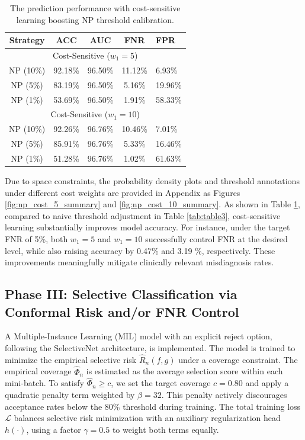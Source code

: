 \documentclass[sigconf,review,anonymous]{acmart}
\theoremstyle{remark}
\begin{document}
\begin{table}[htbp]
    \centering
    \caption{The prediction performance with cost-sensitive learning boosting NP threshold calibration.}
    \label{tab:csl_np_results}
    \begin{tabular}{ccccl}
        \toprule
        Strategy & ACC & AUC & FNR & FPR \\
        \midrule
        \multicolumn{5}{c}{Cost-Sensitive ($w_1=5$)} \\
        \midrule
         NP (10\%) & 92.18\% & 96.50\% & 11.12\% & 6.93\% \\
         NP (5\%)  & 83.19\% & 96.50\% & 5.16\%  & 19.96\% \\
         NP (1\%)  & 53.69\% & 96.50\% & 1.91\%  & 58.33\% \\
        \midrule
        \multicolumn{5}{c}{Cost-Sensitive ($w_1=10$)} \\
        \midrule
         NP (10\%) & 92.26\% & 96.76\% & 10.46\% & 7.01\% \\
         NP (5\%)  & 85.91\% & 96.76\% & 5.33\%  & 16.46\% \\
         NP (1\%)  & 51.28\% & 96.76\% & 1.02\%  & 61.63\% \\
        \bottomrule
    \end{tabular}
    \vskip -0.1in
\end{table}

Due to space constraints, the probability density plots and threshold annotations under different cost weights are provided in Appendix as Figures \ref{fig:np_cost_5_summary} and \ref{fig:np_cost_10_summary}. As shown in Table \ref{tab:csl_np_results}, compared to naive threshold adjustment in Table \ref{tab:table3}, cost‑sensitive learning substantially improves model accuracy. For instance, under the target FNR of 5\%, both $w_{1}=5$ and $w_{1}=10$ successfully control FNR at the desired level, while also raising accuracy by 0.47\% and 3.19 \%, respectively. These improvements meaningfully mitigate clinically relevant misdiagnosis rates.


\subsection{Phase III: Selective Classification via Conformal Risk and/or FNR Control } \label{sec:phase3_results}

A Multiple-Instance Learning (MIL) model with an explicit reject option, following the SelectiveNet architecture, is implemented. The model is trained to minimize the empirical selective risk $\hat{R}_n(f,g)$ under a coverage constraint. The empirical coverage $\hat{\Phi}_n$ is estimated as the average selection score within each mini-batch. To satisfy $\hat{\Phi}_n \ge c$, we set the target coverage $c = 0.80$ and apply a quadratic penalty term weighted by $\beta = 32$. This penalty actively discourages acceptance rates below the 80\% threshold during training. The total training loss $\mathcal{L}$ balances selective risk minimization with an auxiliary regularization head $h(\cdot)$, using a factor $\gamma = 0.5$ to weight both terms equally.
 
\end{document}

